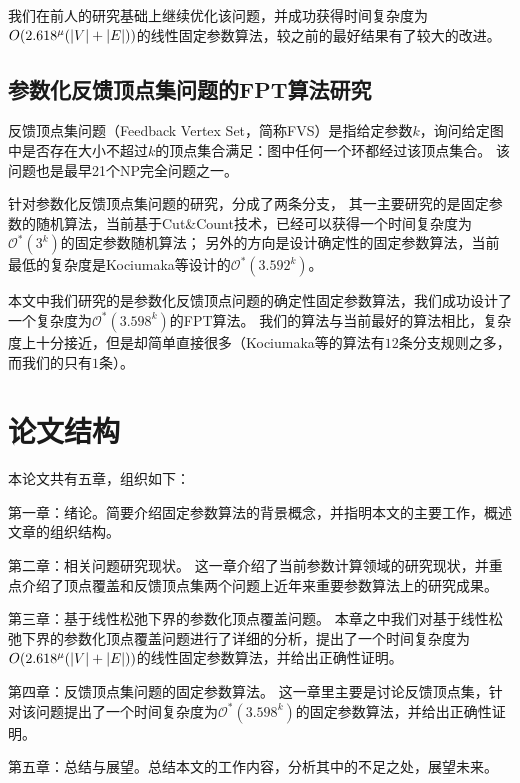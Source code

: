 我们在前人的研究基础上继续优化该问题，并成功获得时间复杂度为$O(2.618^{\mu}(\left\vert V \right\vert+\left\vert E \right\vert))$的线性固定参数算法，较之前的最好结果有了较大的改进。
\subsection{参数化反馈顶点集问题的FPT算法研究}
反馈顶点集问题（Feedback Vertex Set，简称FVS）是指给定参数$k$，询问给定图中是否存在大小不超过$k$的顶点集合满足：图中任何一个环都经过该顶点集合。
该问题也是最早21个NP完全问题之一。

针对参数化反馈顶点集问题的研究，分成了两条分支，
其一主要研究的是固定参数的随机算法，当前基于Cut\&Count技术，已经可以获得一个时间复杂度为$\mathcal{O}^*(3^k)$的固定参数随机算法；
另外的方向是设计确定性的固定参数算法，当前最低的复杂度是Kociumaka等设计的$\mathcal{O}^*(3.592^k)$。

本文中我们研究的是参数化反馈顶点问题的确定性固定参数算法，我们成功设计了一个复杂度为$\mathcal{O}^*(3.598^k)$的FPT算法。
我们的算法与当前最好的算法相比，复杂度上十分接近，但是却简单直接很多（Kociumaka等的算法有$12$条分支规则之多，而我们的只有$1$条）。

\section{论文结构}
本论文共有五章，组织如下：

第一章：绪论。简要介绍固定参数算法的背景概念，并指明本文的主要工作，概述文章的组织结构。

第二章：相关问题研究现状。
这一章介绍了当前参数计算领域的研究现状，并重点介绍了顶点覆盖和反馈顶点集两个问题上近年来重要参数算法上的研究成果。

第三章：基于线性松弛下界的参数化顶点覆盖问题。
本章之中我们对基于线性松弛下界的参数化顶点覆盖问题进行了详细的分析，提出了一个时间复杂度为$O(2.618^{\mu}(\left\vert V \right\vert+\left\vert E \right\vert))$的线性固定参数算法，并给出正确性证明。

第四章：反馈顶点集问题的固定参数算法。
这一章里主要是讨论反馈顶点集，针对该问题提出了一个时间复杂度为$\mathcal{O}^*(3.598^k)$的固定参数算法，并给出正确性证明。

第五章：总结与展望。总结本文的工作内容，分析其中的不足之处，展望未来。
